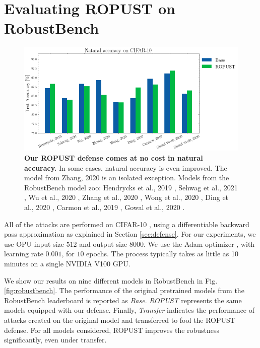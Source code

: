 \section{Evaluating ROPUST on RobustBench}\label{sec:robustbench}
\begin{figure}
    \centering
    \includegraphics[width=\textwidth]{sections/appendix/ropust_icassp2022/natural_accuracy.png}
    \caption{\textbf{Our ROPUST defense comes at no cost in natural accuracy.} In some cases, natural accuracy is even improved. The model from Zhang, 2020 \cite{Zhang2020GeometryawareIA} is an isolated exception. Models from the RobustBench model zoo: Hendrycks et al., 2019 \cite{Hendrycks2019UsingPC}, Sehwag et al., 2021 \cite{Sehwag2021ImprovingAR}, Wu et al., 2020 \cite{Wu2020AdversarialWP}, Zhang et al., 2020 \cite{Zhang2020GeometryawareIA}, Wong et al., 2020 \cite{Wong2020FastIB}, Ding et al., 2020 \cite{Ding2020MaxMarginA}, Carmon et al., 2019 \cite{Carmon2019UnlabeledDI}, Gowal et al., 2020 \cite{Gowal2020UncoveringTL}.}
    \label{fig:natacc}
\end{figure}
All of the attacks are performed on CIFAR-10 \cite{Krizhevsky2009LearningML}, using a differentiable backward pass approximation \cite{athalye2018obfuscated} as explained in Section \ref{sec:defense}. For our experiments, we use OPU input size $512$ and output size $8000$. We use the Adam optimizer \cite{kingma2014adam}, with learning rate $0.001$, for $10$ epochs. The process typically takes as little as 10 minutes on a single NVIDIA V100 GPU. 

We show our results on nine different models in RobustBench in Fig. \ref{fig:robustbench}. The performance of the original pretrained models from the RobustBench leaderboard is reported as \textit{Base}. \textit{ROPUST} represents the same models equipped with our defense. Finally, \textit{Transfer} indicates the performance of attacks created on the original model and transferred to fool the ROPUST defense. For all models considered, ROPUST improves the robustness significantly, even under transfer. 

